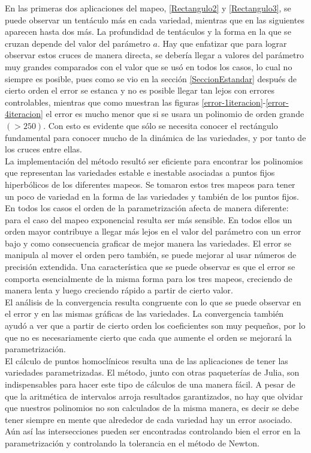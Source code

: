 En las primeras dos aplicaciones del mapeo, \ref{Rectangulo2} y \ref{Rectangulo3}, se puede observar un tentáculo más en cada variedad, mientras que en las siguientes aparecen hasta dos más. La profundidad de tentáculos y la forma en la que se cruzan depende del valor del parámetro $a$. Hay que enfatizar que para lograr observar estos cruces de manera directa, se debería llegar a valores del parámetro muy grandes comparados con el valor que se usó en todos los casos, lo cual no siempre es posible, pues como se vio en la sección \ref{SeccionEstandar} después de cierto orden el error se estanca y no es posible llegar tan lejos con errores controlables, mientras que como muestran las figuras \ref{error-1iteracion}-\ref{error-4iteracion} el error es mucho menor que si se usara un polinomio de orden grande $(>250)$. Con esto es evidente que sólo se necesita conocer el rectángulo fundamental para conocer mucho de la dinámica de las variedades, y por tanto de los cruces entre ellas.\\ 


La implementación del método resultó ser eficiente para encontrar los polinomios que representan las variedades estable e inestable asociadas a puntos fijos hiperbólicos de los diferentes mapeos. Se tomaron estos tres mapeos para tener un poco de variedad en la forma de las variedades y también de los puntos fijos. En todos los casos el orden de la parametrización afecta de manera diferente: para el caso del mapeo exponencial resulta ser más sensible. En todos ellos un orden mayor contribuye a llegar más lejos en el valor del parámetro con un error bajo y como consecuencia graficar de mejor manera las variedades. El error se manipula al mover el orden pero también, se puede mejorar al usar números de precisión extendida. Una característica que se puede observar es que el error se comporta esencialmente de la misma forma para los tres mapeos, creciendo de manera lenta y luego creciendo rápido a partir de cierto valor. \\


El análisis de la convergencia resulta congruente con lo que se puede observar en el error y en las mismas gráficas de las variedades. La convergencia también ayudó a ver que a partir de cierto orden los coeficientes son muy pequeños, por lo que no es necesariamente cierto que cada que aumente el orden se mejorará la parametrización.\\


El cálculo de puntos homoclínicos resulta una de las aplicaciones de tener las variedades parametrizadas. El método, junto con otras paqueterías de Julia, son in\-dis\-pen\-sa\-bles para hacer este tipo de cálculos de una manera fácil. A pesar de que la aritmética de intervalos arroja resultados garantizados, no hay que olvidar que nuestros polinomios no son calculados de la misma manera, es decir se debe tener siempre en mente que alrededor de cada variedad hay un error asociado. Aún así las intersecciones pueden ser encontradas controlando bien el error en la parametrización y controlando la tolerancia en el método de Newton.